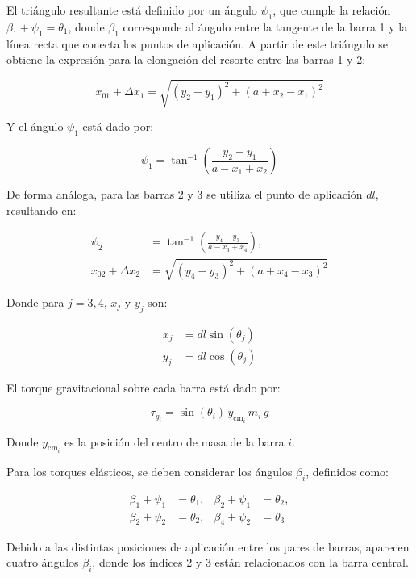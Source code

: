 El triángulo resultante está definido por un ángulo \(\psi_1\), que cumple la relación \(\beta_1 + \psi_1 = \theta_1\), donde \(\beta_1\) corresponde al ángulo entre la tangente de la barra 1 y la línea recta que conecta los puntos de aplicación. A partir de este triángulo se obtiene la expresión para la elongación del resorte entre las barras 1 y 2:

\begin{equation}
x_{01} + \Delta x_{1} = \sqrt{(y_2 - y_1)^2 + (a + x_2 - x_1)^2}
\end{equation}

Y el ángulo \(\psi_1\) está dado por:

\begin{equation}
\psi_1 = \tan^{-1}\left( \frac{y_2 - y_1}{a - x_1 + x_2} \right)
\end{equation}

De forma análoga, para las barras 2 y 3 se utiliza el punto de aplicación \(dl\), resultando en:

\begin{align}
\psi_2 &= \tan^{-1} \left( \frac{y_4 - y_3}{a - x_3 + x_4} \right), \\
x_{02} + \Delta x_{2} &= \sqrt{(y_4 - y_3)^2 + (a + x_4 - x_3)^2}
\end{align}

Donde para \(j = 3, 4\), \(x_j\) y \(y_j\) son:

\begin{align}
x_j &= d l \sin(\theta_{j}) \\
y_j &= d l \cos(\theta_{j})
\end{align}

El torque gravitacional sobre cada barra está dado por:

\begin{equation}
\tau_{g_i} = \sin(\theta_i) \, y_{\text{cm}_i} \, m_i \, g
\end{equation}

Donde \(y_{\text{cm}_i}\) es la posición del centro de masa de la barra \(i\).

Para los torques elásticos, se deben considerar los ángulos \(\beta_i\), definidos como:

\begin{align}
\beta_1 + \psi_1 &= \theta_1, & \beta_2 + \psi_1 &= \theta_2, \\
\beta_2 + \psi_2 &= \theta_2, & \beta_4 + \psi_2 &= \theta_3
\end{align}

Debido a las distintas posiciones de aplicación entre los pares de barras, aparecen cuatro ángulos \(\beta_i\), donde los índices 2 y 3 están relacionados con la barra central.

